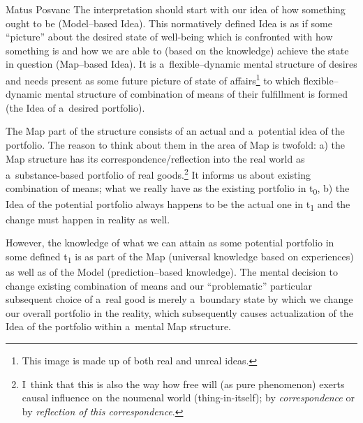 \begin{artengenv}{Matus Posvanc}
The interpretation should start with our idea of how something ought to be (Model–based Idea). This normatively defined Idea is as if some ``picture'' about the desired state of well-being which is confronted with how something is and how we are able to (based on the knowledge) achieve the state in question (Map–based Idea). It is a~flexible–dynamic mental structure of desires and needs present as some future picture of state of affairs\footnote{This image is made up of both real and unreal ideas.} to which flexible–dynamic mental structure of combination of means of their fulfillment is formed (the Idea of a~desired portfolio).



The Map part of the structure consists of an actual and a~potential idea of the portfolio. The reason to think about them in the area of Map is twofold: a) the Map structure has its correspondence/reflection into the real world as a~substance-based portfolio of real goods.\footnote{I~think that this is also the way how free will (as pure phenomenon) exerts causal influence on the noumenal world (thing-in-itself); by \textit{correspondence} or by \textit{reflection of this correspondence}.} It informs us about existing combination of means; what we really have as the existing portfolio in t\textsubscript{0}, b) the Idea of the potential portfolio always happens to be the actual one in t\textsubscript{1} and the change must happen in reality as well.



However, the knowledge of what we can attain as some potential portfolio in some defined t\textsubscript{1 }is as part of the Map (universal knowledge based on experiences) as well as of the Model (prediction–based knowledge). The mental decision to change existing combination of means and our ``problematic'' particular subsequent choice of a~real good is merely a~boundary state by which we change our overall portfolio in the reality, which subsequently causes actualization of the Idea of the portfolio within a~mental Map structure.




\end{artengenv}
